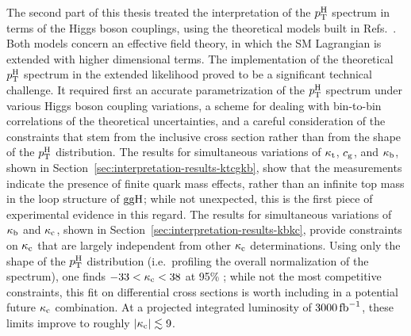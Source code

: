 The second part of this thesis treated the interpretation of the $p_\mathrm{T}^\mathrm{H}$ spectrum in terms of the Higgs boson couplings, using the theoretical models built in Refs.~\cite{Grazzini:2017szg,Grazzini:2016paz,Bishara:2016jga}.
% 
Both models concern an effective field theory, in which the SM Lagrangian is extended with higher dimensional terms.
% 
The implementation of the theoretical $p_\mathrm{T}^\mathrm{H}$ spectrum in the extended likelihood proved to be a significant technical challenge.
% 
It required first an accurate parametrization of the $p_\mathrm{T}^\mathrm{H}$ spectrum under various Higgs boson coupling variations, a scheme for dealing with bin-to-bin correlations of the theoretical uncertainties, and a careful consideration of the constraints that stem from the inclusive cross section rather than from the shape of the $p_\mathrm{T}^\mathrm{H}$ distribution.
% 
The results for simultaneous variations of $\kappa_{\mathrm{t}}$, $c_\mathrm{g}$, and $\kappa_{\mathrm{b}}$, shown in Section~\ref{sec:interpretation-results-ktcgkb}, show that the measurements indicate the presence of finite quark mass effects, rather than an infinite top mass in the loop structure of $\mathrm{g}\mathrm{g}\mathrm{H}$; while not unexpected, this is the first piece of experimental evidence in this regard.
% 
The results for simultaneous variations of $\kappa_{\mathrm{b}}$ and $\kappa_{\mathrm{c}}$, shown in Section~\ref{sec:interpretation-results-kbkc}, provide constraints on $\kappa_{\mathrm{c}}$ that are largely independent from other $\kappa_{\mathrm{c}}$ determinations.
% 
Using only the shape of the $p_\mathrm{T}^\mathrm{H}$ distribution (i.e.\ profiling the overall normalization of the spectrum), one finds $-33 < \kappa_{\mathrm{c}} < 38$ at 95\% \CL; while not the most competitive constraints, this fit on differential cross sections is worth including in a potential future $\kappa_{\mathrm{c}}$ combination.
% 
At a projected integrated luminosity of $3000\,\text{fb}^{-1}$, these limits improve to roughly $\left| \kappa_{\mathrm{c}} \right |\lesssim9$.



